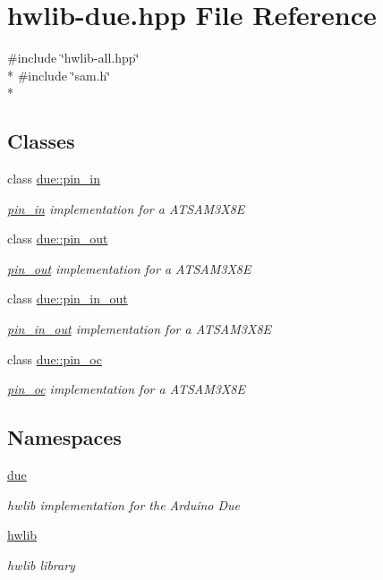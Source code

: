 \hypertarget{hwlib-due_8hpp}{}\section{hwlib-\/due.hpp File Reference}
\label{hwlib-due_8hpp}
{\ttfamily \#include \char`\"{}hwlib-\/all.\+hpp\char`\"{}}\\*
{\ttfamily \#include \char`\"{}sam.\+h\char`\"{}}\\*
\subsection*{Classes}
\begin{DoxyCompactItemize}
\item 
class \hyperlink{classdue_1_1pin__in}{due\+::pin\+\_\+in}
\begin{DoxyCompactList}\small\item\em \hyperlink{classdue_1_1pin__in}{pin\+\_\+in} implementation for a A\+T\+S\+A\+M3\+X8E \end{DoxyCompactList}\item 
class \hyperlink{classdue_1_1pin__out}{due\+::pin\+\_\+out}
\begin{DoxyCompactList}\small\item\em \hyperlink{classdue_1_1pin__out}{pin\+\_\+out} implementation for a A\+T\+S\+A\+M3\+X8E \end{DoxyCompactList}\item 
class \hyperlink{classdue_1_1pin__in__out}{due\+::pin\+\_\+in\+\_\+out}
\begin{DoxyCompactList}\small\item\em \hyperlink{classdue_1_1pin__in__out}{pin\+\_\+in\+\_\+out} implementation for a A\+T\+S\+A\+M3\+X8E \end{DoxyCompactList}\item 
class \hyperlink{classdue_1_1pin__oc}{due\+::pin\+\_\+oc}
\begin{DoxyCompactList}\small\item\em \hyperlink{classdue_1_1pin__oc}{pin\+\_\+oc} implementation for a A\+T\+S\+A\+M3\+X8E \end{DoxyCompactList}\end{DoxyCompactItemize}
\subsection*{Namespaces}
\begin{DoxyCompactItemize}
\item 
 \hyperlink{namespacedue}{due}
\begin{DoxyCompactList}\small\item\em hwlib implementation for the Arduino Due \end{DoxyCompactList}\item 
 \hyperlink{namespacehwlib}{hwlib}
\begin{DoxyCompactList}\small\item\em hwlib library \end{DoxyCompactList}\end{DoxyCompactItemize}
